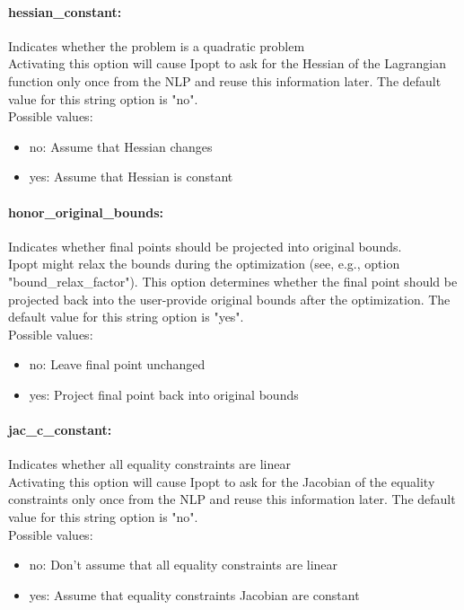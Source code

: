 \paragraph{hessian\_constant:}\label{sec:hessian_constant} Indicates whether the problem is a quadratic problem $\;$ \\
 Activating this option will cause Ipopt to ask
for the Hessian of the Lagrangian function only
once from the NLP and reuse this information
later.
The default value for this string option is "no".
\\ 
Possible values:
\begin{itemize}
   \item no: Assume that Hessian changes
   \item yes: Assume that Hessian is constant
\end{itemize}

\paragraph{honor\_original\_bounds:}\label{sec:honor_original_bounds} Indicates whether final points should be projected into original bounds. $\;$ \\
 Ipopt might relax the bounds during the
optimization (see, e.g., option
"bound\_relax\_factor").  This option determines
whether the final point should be projected back
into the user-provide original bounds after the
optimization.
The default value for this string option is "yes".
\\ 
Possible values:
\begin{itemize}
   \item no: Leave final point unchanged
   \item yes: Project final point back into original bounds
\end{itemize}

\paragraph{jac\_c\_constant:}\label{sec:jac_c_constant} Indicates whether all equality constraints are linear $\;$ \\
 Activating this option will cause Ipopt to ask
for the Jacobian of the equality constraints only
once from the NLP and reuse this information
later.
The default value for this string option is "no".
\\ 
Possible values:
\begin{itemize}
   \item no: Don't assume that all equality constraints are
linear
   \item yes: Assume that equality constraints Jacobian are
constant
\end{itemize}

